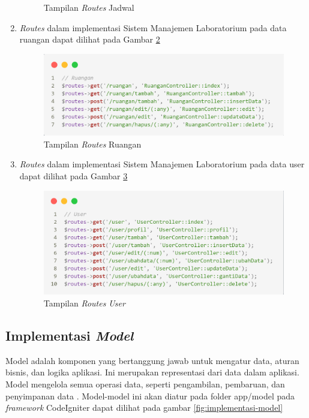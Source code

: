 \begin{enumerate}
\begin{figure}
		      \caption{Tampilan \textit{Routes} Jadwal}
		      \label{fig:routes-jadwal}
	      \end{figure}
	\item \textit{Routes} dalam implementasi Sistem Manajemen Laboratorium pada data ruangan dapat dilihat pada Gambar \ref{fig:routes-ruangan}
	      \begin{figure}
		      \centering
		      \includegraphics[width=0.82\linewidth]{konten//gambar/routes/ruangan.png}
		      \caption{Tampilan \textit{Routes} Ruangan}
		      \label{fig:routes-ruangan}
	      \end{figure}
	\item \textit{Routes} dalam implementasi Sistem Manajemen Laboratorium pada data user dapat dilihat pada Gambar \ref{fig:routes-user}
	      \begin{figure}
		      \centering
		      \includegraphics[width=0.82\linewidth]{konten//gambar/routes/user.png}
		      \caption{Tampilan \textit{Routes} \textit{User}}
		      \label{fig:routes-user}
	      \end{figure}
\end{enumerate}

\subsection{Implementasi \textit{Model}}
Model adalah komponen yang bertanggung jawab untuk mengatur data, aturan bisnis, dan logika aplikasi. Ini merupakan representasi dari data dalam aplikasi. Model mengelola semua operasi data, seperti pengambilan, pembaruan, dan penyimpanan data \cite{firdaus2020rancang}. Model-model ini akan diatur pada folder app/model pada \textit{framework} CodeIgniter dapat dilihat pada gambar \ref{fig:implementasi-model}

